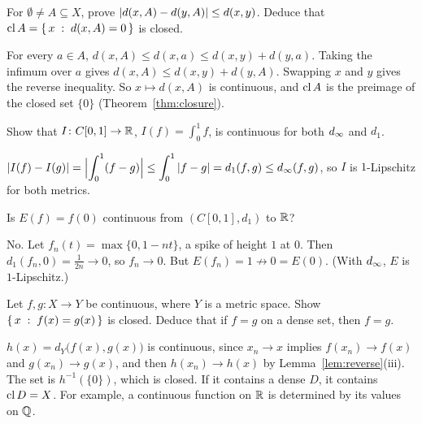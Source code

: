 \begin{exercise}\medium
For $\emptyset\ne A\subseteq X$, prove $\left\lvert d(x,A)-d(y,A)\right\rvert\le d(x,y)$. Deduce that $\operatorname{cl} A=\left\{\, x \;:\; d(x,A)=0 \,\right\}$ is closed.
\end{exercise}
\begin{solution}
For every $a\in A$, $d(x,A)\le d(x,a)\le d(x,y)+d(y,a)$. Taking the infimum over $a$ gives $d(x,A)\le d(x,y)+d(y,A)$. Swapping $x$ and $y$ gives the reverse inequality. So $x\mapsto d(x,A)$ is continuous, and $\operatorname{cl} A$ is the preimage of the closed set $\{0\}$ (Theorem~\ref{thm:closure}).
\end{solution}

\begin{exercise}\medium
Show that $I\colon C[0,1]\to\mathbb{R}$, $I(f)=\int_0^1f$, is continuous for both $d_\infty$ and $d_1$.
\end{exercise}
\begin{solution}
$\displaystyle\left\lvert I(f)-I(g)\right\rvert=\Bigl|\int_0^1(f-g)\Bigr|\le\int_0^1\left\lvert f-g\right\rvert=d_1(f,g)\le d_\infty(f,g)$, so $I$ is $1$-Lipschitz for both metrics.
\end{solution}

\begin{exercise}\hard
Is $E(f)=f(0)$ continuous from $(C[0,1],d_1)$ to $\mathbb{R}$?
\end{exercise}
\begin{solution}
No. Let $f_n(t)=\max\{0,1-nt\}$, a spike of height $1$ at $0$. Then $d_1(f_n,0)=\frac1{2n}\to0$, so $f_n\to0$. But $E(f_n)=1\not\to0=E(0)$. (With $d_\infty$, $E$ is $1$-Lipschitz.)
\end{solution}

\begin{exercise}\hard
Let $f,g\colon X\to Y$ be continuous, where $Y$ is a metric space. Show $\left\{\, x \;:\; f(x)=g(x) \,\right\}$ is closed. Deduce that if $f=g$ on a dense set, then $f=g$.
\end{exercise}
\begin{solution}
$h(x)=d_Y\bigl(f(x),g(x)\bigr)$ is continuous, since $x_n\to x$ implies $f(x_n)\to f(x)$ and $g(x_n)\to g(x)$, and then $h(x_n)\to h(x)$ by Lemma~\ref{lem:reverse}(iii). The set is $h^{-1}(\{0\})$, which is closed. If it contains a dense $D$, it contains $\operatorname{cl} D=X$. For example, a continuous function on $\mathbb{R}$ is determined by its values on $\mathbb{Q}$.
\end{solution}
